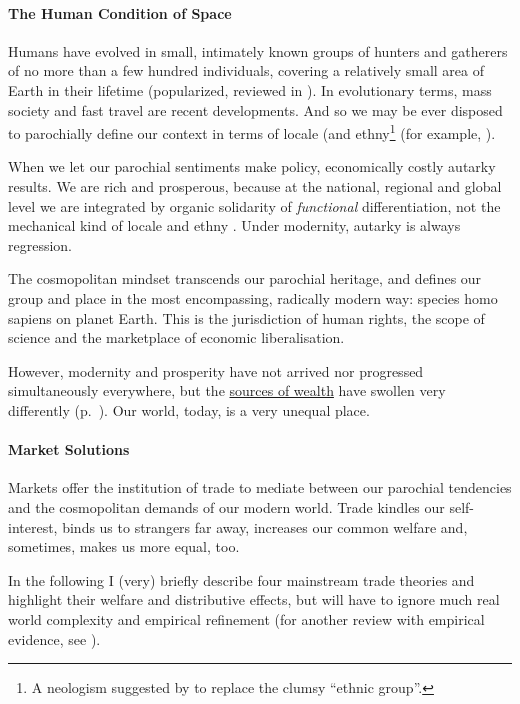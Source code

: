 \paragraph{The Human Condition of Space} Humans have evolved in small, intimately known groups of hunters and gatherers of no more than a few hundred individuals, covering a relatively small area of Earth in their lifetime (popularized, reviewed in \citealt{Diamond1997}). In evolutionary terms, mass society and fast travel are recent developments. And so we may be ever disposed to parochially define our context in terms of locale (and ethny\footnote{
	A neologism suggested by \citeauthor{Van-den-Berghe-1981-aa} to replace the clumsy ``ethnic group''.}
(for example, \citealt{Van-den-Berghe-1981-aa}).

When we let our parochial sentiments make policy, economically costly autarky results. We are rich and prosperous, because at the national, regional and global level we are integrated by organic solidarity of \emph{functional} differentiation, not the mechanical kind of locale and ethny \citep{Durkheim-1893-aa}. Under modernity, autarky is always regression.

The cosmopolitan mindset transcends our parochial heritage, and defines our group and place in the most encompassing, radically modern way: species homo sapiens on planet Earth. This is the jurisdiction of human rights, the scope of science and the marketplace of economic liberalisation.

However, modernity and prosperity have not arrived nor progressed simultaneously everywhere, but the  \hyperref[sec:sources-of-wealth]{sources of wealth} have swollen very differently (p.~\pageref{sec:sources-of-wealth}). Our world, today, is a very unequal place. 

\paragraph{Market Solutions}  \label{sec:trade} Markets offer the institution of trade to mediate between our parochial tendencies and the cosmopolitan demands of our modern world. Trade kindles our self-interest, binds us to strangers far away, increases our common welfare and, sometimes, makes us more equal, too. %

In the following I (very) briefly describe four mainstream trade theories and highlight their welfare and distributive effects, but will have to ignore much real world complexity and empirical refinement (for another review with empirical evidence, see \citealt{Beckfield2009}).

